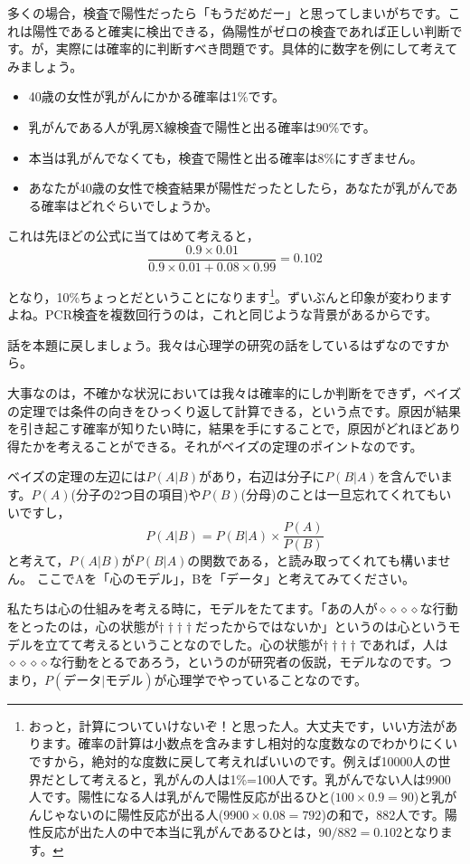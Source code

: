 \documentclass{ltjsarticle}
\begin{document}
多くの場合，検査で陽性だったら「もうだめだー」と思ってしまいがちです。これは陽性であると確実に検出できる，偽陽性がゼロの検査であれば正しい判断です。が，実際には確率的に判断すべき問題です。具体的に数字を例にして考えてみましょう。

\begin{itemize}
    \item 40歳の女性が乳がんにかかる確率は1\%です。
    \item 乳がんである人が乳房X線検査で陽性と出る確率は90\%です。
    \item 本当は乳がんでなくても，検査で陽性と出る確率は8\%にすぎません。
    \item あなたが40歳の女性で検査結果が陽性だったとしたら，あなたが乳がんである確率はどれぐらいでしょうか。
\end{itemize}
これは先ほどの公式に当てはめて考えると，
\[\frac{0.9\times0.01}{0.9\times0.01+0.08\times0.99}=0.102 \]

となり，10\%ちょっとだということになります\footnote{おっと，計算についていけないぞ！と思った人。大丈夫です，いい方法があります。確率の計算は小数点を含みますし相対的な度数なのでわかりにくいですから，絶対的な度数に戻して考えればいいのです。例えば10000人の世界だとして考えると，乳がんの人は1\%=100人です。乳がんでない人は9900人です。陽性になる人は乳がんで陽性反応が出るひと($100\times0.9=90$)と乳がんじゃないのに陽性反応が出る人($9900\times0.08=792$)の和で，882人です。陽性反応が出た人の中で本当に乳がんであるひとは，$90/882=0.102$となります。}。ずいぶんと印象が変わりますよね。PCR検査を複数回行うのは，これと同じような背景があるからです。

話を本題に戻しましょう。我々は心理学の研究の話をしているはずなのですから。

大事なのは，不確かな状況においては我々は確率的にしか判断をできず，ベイズの定理では条件の向きをひっくり返して計算できる，という点です。原因が結果を引き起こす確率が知りたい時に，結果を手にすることで，原因がどれほどあり得たかを考えることができる。それがベイズの定理のポイントなのです。

ベイズの定理の左辺には$P(A|B)$があり，右辺は分子に$P(B|A)$を含んでいます。$P(A)$(分子の2つ目の項目)や$P(B)$(分母)のことは一旦忘れてくれてもいいですし，
\[ P(A|B) = P(B|A) \times \frac{P(A)}{P(B)}\]
と考えて，$P(A|B)$が$P(B|A)$の関数である，と読み取ってくれても構いません。
ここでAを「心のモデル」，Bを「データ」と考えてみてください。

私たちは心の仕組みを考える時に，モデルをたてます。「あの人が$\diamond\diamond\diamond\diamond$な行動をとったのは，心の状態が$\dagger\dagger\dagger\dagger$だったからではないか」というのは心というモデルを立てて考えるということなのでした。心の状態が$\dagger\dagger\dagger\dagger$であれば，人は$\diamond\diamond\diamond\diamond$な行動をとるであろう，というのが研究者の仮説，モデルなのです。つまり，$P(\mbox{データ}|\mbox{モデル})$が心理学でやっていることなのです。
\end{document}
